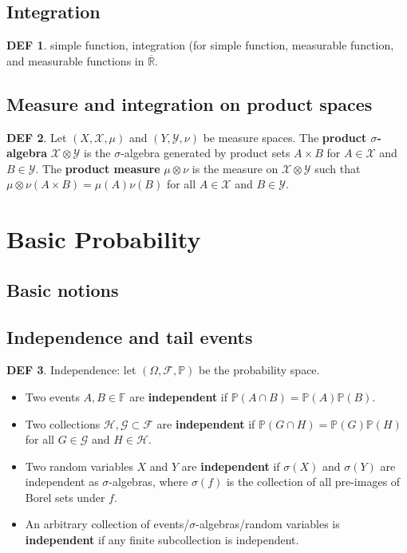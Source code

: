 \documentclass[hidelinks,11pt]{article}
\theoremstyle{definition}
\newtheorem*{defin}{DEF}
\theoremstyle{dotless}
\theoremstyle{remark}
\DeclareMathOperator{\1}{\mathbf{1}}
\begin{document}
\subsection{Integration}

\begin{defin}
simple function, integration (for simple function, measurable function, and measurable functions in $\overline{\mathbb{R}}$.
\end{defin}

\subsection{Measure and integration on product spaces}

\begin{defin}
Let $(X,\mathcal{X},\mu)$ and $(Y,\mathcal{Y},\nu)$ be measure spaces. The \textbf{product $\sigma$-algebra} $\mathcal{X}\otimes\mathcal{Y}$ is the $\sigma$-algebra generated by product sets $A\times B$ for $A\in\mathcal{X}$ and $B\in\mathcal{Y}$. The \textbf{product measure} $\mu\otimes\nu$ is the measure on $\mathcal{X}\otimes\mathcal{Y}$ such that $\mu\otimes\nu(A\times B)=\mu(A)\nu(B)$ for all $A\in\mathcal{X}$ and $B\in\mathcal{Y}$.
\end{defin}

\section{Basic Probability}

\subsection{Basic notions}

\subsection{Independence and tail events}

\begin{defin}
Independence: let $(\Omega,\mathcal{F},\mathbb{P})$ be the probability space.\begin{itemize}
    \item Two events $A,B\in\mathbb{F}$ are \textbf{independent} if $\mathbb{P}(A\cap B)=\mathbb{P}(A)\mathbb{P}(B)$.
    \item Two collections $\mathcal{H},\mathcal{G}\subset\mathcal{F}$ are \textbf{independent} if $\mathbb{P}(G\cap H)=\mathbb{P}(G)\mathbb{P}(H)$ for all $G\in\mathcal{G}$ and $H\in\mathcal{H}$.
    \item Two random variables $X$ and $Y$ are \textbf{independent} if $\sigma(X)$ and $\sigma(Y)$ are independent as $\sigma$-algebras, where $\sigma(f)$ is the collection of all pre-images of Borel sets under $f$.
    \item An arbitrary collection of events/$\sigma$-algebras/random variables is \textbf{independent} if any finite subcollection is independent.
\end{itemize}
\end{defin}
\end{document}
